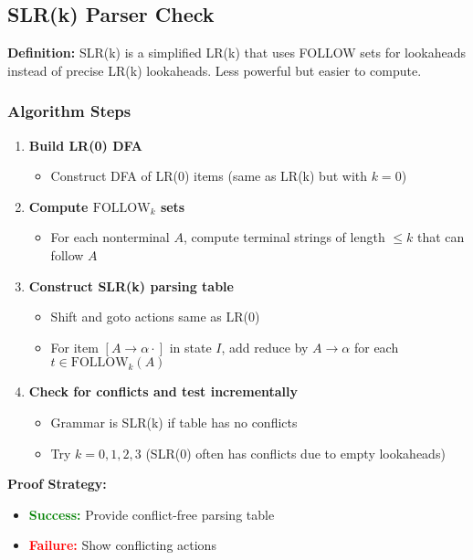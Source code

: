 \subsection{SLR(k) Parser Check}

\textbf{Definition:} SLR(k) is a simplified LR(k) that uses FOLLOW sets for lookaheads instead of precise LR(k) lookaheads. Less powerful but easier to compute.

\subsubsection{Algorithm Steps}

\begin{enumerate}
    \item \textbf{Build LR(0) DFA}
    \begin{itemize}
        \item Construct DFA of LR(0) items (same as LR(k) but with $k = 0$)
    \end{itemize}
    
    \item \textbf{Compute $\text{FOLLOW}_k$ sets}
    \begin{itemize}
        \item For each nonterminal $A$, compute terminal strings of length $\leq k$ that can follow $A$
    \end{itemize}
    
    \item \textbf{Construct SLR(k) parsing table}
    \begin{itemize}
        \item Shift and goto actions same as LR(0)
        \item For item $[A \to \alpha \cdot]$ in state $I$, add reduce by $A \to \alpha$ for each $t \in \text{FOLLOW}_k(A)$
    \end{itemize}
    
    \item \textbf{Check for conflicts and test incrementally}
    \begin{itemize}
        \item Grammar is SLR(k) if table has no conflicts
        \item Try $k = 0, 1, 2, 3$ (SLR(0) often has conflicts due to empty lookaheads)
    \end{itemize}
\end{enumerate}

\textbf{Proof Strategy:}
\begin{itemize}
    \item \textcolor{green}{\textbf{Success:}} Provide conflict-free parsing table
    \item \textcolor{red}{\textbf{Failure:}} Show conflicting actions
\end{itemize}

